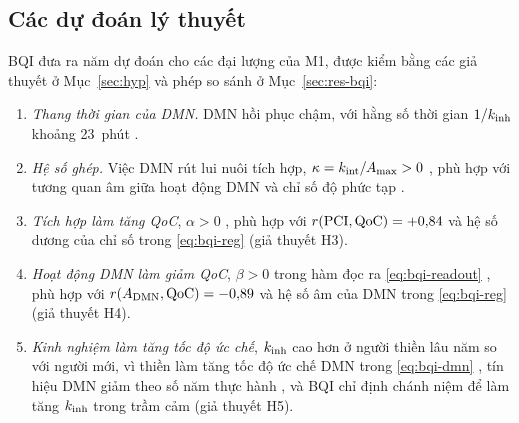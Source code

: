 \subsection{Các dự đoán lý thuyết}
\label{sec:theory-pred}
BQI đưa ra năm dự đoán cho các đại lượng của M1, được kiểm bằng các giả thuyết ở Mục~\ref{sec:hyp} và phép so sánh ở Mục~\ref{sec:res-bqi}:
\begin{enumerate}
  \item[T1] \emph{Thang thời gian của DMN.} DMN hồi phục chậm, với hằng số thời gian $1/k_{\mathrm{inh}}$ khoảng 23~phút \cite[Bảng~5]{BQI}.
  \item[T2] \emph{Hệ số ghép.} Việc DMN rút lui nuôi tích hợp, $\kappa=k_{\mathrm{int}}/A_{\max}>0$ \cite[pt.~(53)]{BQI}, phù hợp với tương quan âm giữa hoạt động DMN và chỉ số độ phức tạp \cite[pt.~(58) và Nhận xét~6.1]{BQI}.
  \item[T3] \emph{Tích hợp làm tăng QoC}, $\alpha>0$ \cite[Bảng~5]{BQI}, phù hợp với $r(\mathrm{PCI},\mathrm{QoC})=+0{,}84$ và hệ số dương của chỉ số trong \eqref{eq:bqi-reg} \cite[pt.~(58)--(59)]{BQI} (giả thuyết H3).
  \item[T4] \emph{Hoạt động DMN làm giảm QoC}, $\beta>0$ trong hàm đọc ra \eqref{eq:bqi-readout} \cite[Bảng~5]{BQI}, phù hợp với $r(A_{\mathrm{DMN}},\mathrm{QoC})=-0{,}89$ và hệ số âm của DMN trong \eqref{eq:bqi-reg} \cite[pt.~(58)--(59)]{BQI} (giả thuyết H4).
  \item[T5] \emph{Kinh nghiệm làm tăng tốc độ ức chế}, $k_{\mathrm{inh}}$ cao hơn ở người thiền lâu năm so với người mới, vì thiền làm tăng tốc độ ức chế DMN trong \eqref{eq:bqi-dmn} \cite[pt.~(51)]{BQI}, tín hiệu DMN giảm theo số năm thực hành \cite[Bảng~7 và Mục~7.5]{BQI}, và BQI chỉ định chánh niệm để làm tăng $k_{\mathrm{inh}}$ trong trầm cảm \cite[Bảng~10]{BQI} (giả thuyết H5).
\end{enumerate}
